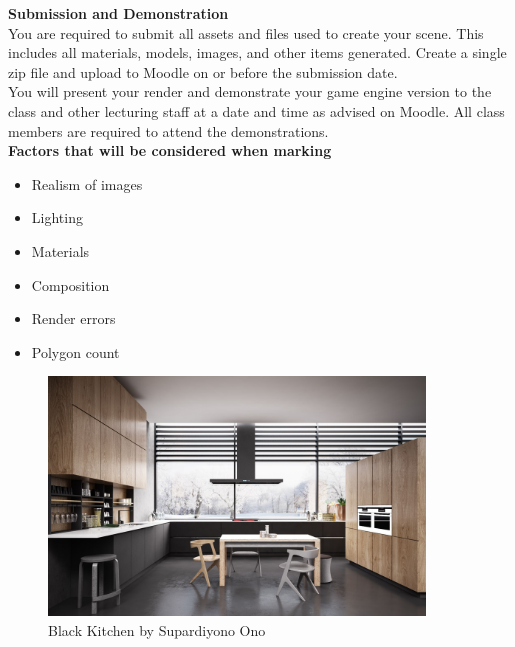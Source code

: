 \textbf{Submission and Demonstration}\\

You are required to submit all assets and files used to create your scene.  This includes all materials, models, images, and other items generated.  Create a single zip file and upload to Moodle on or before the submission date.\\

You will present your render and demonstrate your game engine version to the class and other lecturing staff at a date and time as advised on Moodle.  All class members are required to attend the demonstrations.\\



\textbf{Factors that will be considered when marking}\\
\begin{itemize}
	\item Realism of images
	\item Lighting
	\item Materials
	\item Composition
	\item Render errors
	\item Polygon count
\end{itemize}





\begin{figure}
	\centering
		\includegraphics[width=10cm]{img/blackKitchen.jpg}
	\caption{Black Kitchen by Supardiyono Ono}
	\label{fig:1}
\end{figure}



